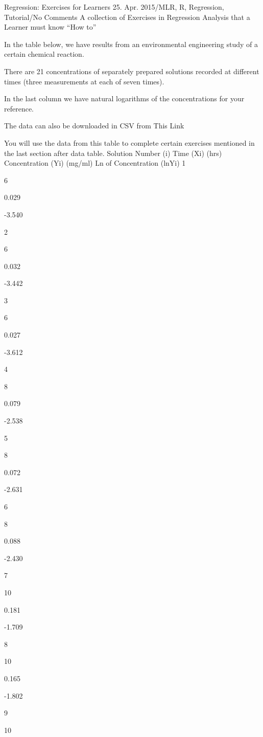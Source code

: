 
Regression: Exercises for Learners
25. Apr. 2015/MLR, R, Regression, Tutorial/No Comments
A collection of Exercises in Regression Analysis that a Learner must know “How to”

In the table below, we have results from an environmental engineering study of a certain chemical reaction.

There are 21 concentrations of separately prepared solutions recorded at different times (three measurements at each of seven times).

In the last column we have natural logarithms of the concentrations for your reference.

The data can also be downloaded in CSV from This Link

You will use the data from this table to complete certain exercises mentioned in the last section after data table.
Solution Number
(i)
Time (Xi)
(hrs)
Concentration (Yi)
(mg/ml)
Ln of Concentration
(lnYi)
1

6

0.029

-3.540

2

6

0.032

-3.442

3

6

0.027

-3.612

4

8

0.079

-2.538

5

8

0.072

-2.631

6

8

0.088

-2.430

7

10

0.181

-1.709

8

10

0.165

-1.802

9

10

